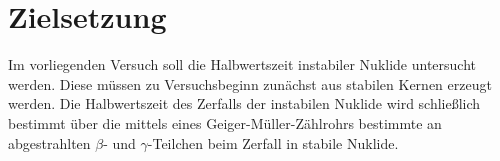 \section{Zielsetzung}
\label{sec:Zielsetzung}
Im vorliegenden Versuch soll die Halbwertszeit instabiler Nuklide untersucht werden.
Diese müssen zu Versuchsbeginn zunächst aus stabilen Kernen erzeugt werden. Die Halbwertszeit des Zerfalls der instabilen Nuklide wird schließlich bestimmt über die mittels eines Geiger-Müller-Zählrohrs bestimmte  an abgestrahlten $\beta$- und $\gamma$-Teilchen beim Zerfall in stabile Nuklide.
